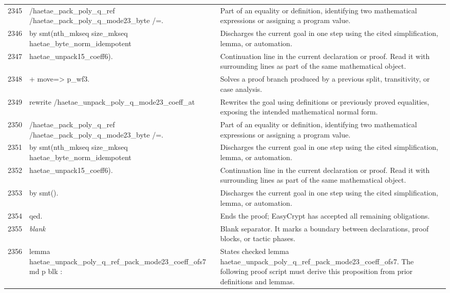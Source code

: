 \documentclass[10pt]{article}
\begin{document}
\begin{longtable}{r L{0.53\textwidth} L{0.37\textwidth}}
2345 & {\ttfamily\scriptsize           /haetae\_pack\_poly\_q\_ref /haetae\_pack\_poly\_q\_mode23\_byte /=.} & Part of an equality or definition, identifying two mathematical expressions or assigning a program value. \\
2346 & {\ttfamily\scriptsize   by smt(nth\_mkseq size\_mkseq haetae\_byte\_norm\_idempotent} & Discharges the current goal in one step using the cited simplification, lemma, or automation. \\
2347 & {\ttfamily\scriptsize          haetae\_unpack15\_coeff6).} & Continuation line in the current declaration or proof.  Read it with surrounding lines as part of the same mathematical object. \\
2348 & {\ttfamily\scriptsize + move=> p\_wf3.} & Solves a proof branch produced by a previous split, transitivity, or case analysis. \\
2349 & {\ttfamily\scriptsize   rewrite /haetae\_unpack\_poly\_q\_mode23\_coeff\_at} & Rewrites the goal using definitions or previously proved equalities, exposing the intended mathematical normal form. \\
2350 & {\ttfamily\scriptsize           /haetae\_pack\_poly\_q\_ref /haetae\_pack\_poly\_q\_mode23\_byte /=.} & Part of an equality or definition, identifying two mathematical expressions or assigning a program value. \\
2351 & {\ttfamily\scriptsize   by smt(nth\_mkseq size\_mkseq haetae\_byte\_norm\_idempotent} & Discharges the current goal in one step using the cited simplification, lemma, or automation. \\
2352 & {\ttfamily\scriptsize          haetae\_unpack15\_coeff6).} & Continuation line in the current declaration or proof.  Read it with surrounding lines as part of the same mathematical object. \\
2353 & {\ttfamily\scriptsize by smt().} & Discharges the current goal in one step using the cited simplification, lemma, or automation. \\
2354 & {\ttfamily\scriptsize qed.} & Ends the proof; EasyCrypt has accepted all remaining obligations. \\
2355 & {\ttfamily\scriptsize \emph{blank}} & Blank separator.  It marks a boundary between declarations, proof blocks, or tactic phases. \\
2356 & {\ttfamily\scriptsize lemma haetae\_unpack\_poly\_q\_ref\_pack\_mode23\_coeff\_ofs7 md p blk :} & States checked lemma haetae\_unpack\_poly\_q\_ref\_pack\_mode23\_coeff\_ofs7.  The following proof script must derive this proposition from prior definitions and lemmas. \\

\end{longtable}
\end{document}

